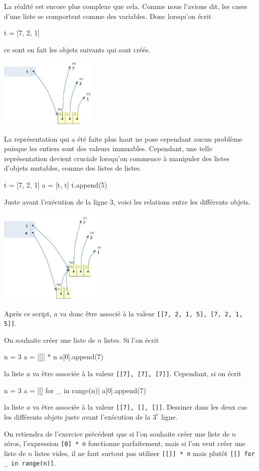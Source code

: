 \documentclass{magnoliaold}
\begin{document}
La réalité est encore plus complexe que cela. Comme nous l'avions dit, les cases d'une liste se
comportent comme des variables. Donc lorsqu'on écrit
\begin{pythoncode}
t = [7, 2, 1]
\end{pythoncode}
\noindent ce sont en fait les objets suivants qui sont créés.
\begin{center}
\includegraphics[width=0.35\textwidth]{../../commun/images/python-cours-tutor-10}
\end{center}
La représentation qui a été faite plus haut ne pose cependant aucun problème puisque les entiers sont
des valeurs immuables. Cependant, une telle représentation devient cruciale lorsqu'on commence à manipuler
des listes d'objets mutables, comme des listes de listes.
\begin{pythoncode}
t = [7, 2, 1]
a = [t, t]
t.append(5)
\end{pythoncode}
\noindent Juste avant l'exécution de la ligne 3, voici les relations entre les différents objets.
\begin{center}
\includegraphics[width=0.39\textwidth]{../../commun/images/python-cours-tutor-12}
\end{center}
Après ce script, $a$ va donc être associé à la valeur \verb![[7, 2, 1, 5], [7, 2, 1, 5]]!.
\vspace{2ex}
\begin{exoUnique}
\exo On souhaite créer une liste de $n$ listes. Si l'on écrit
\begin{pythoncode}
n = 3
a = [[]] * n
a[0].append(7)
\end{pythoncode}
  la liste $a$ va être associée à la valeur \verb![[7], [7], [7]]!. Cependant, si on écrit
\begin{pythoncode}
n = 3
a = [[] for _ in range(n)]
a[0].append(7)
\end{pythoncode}
la liste $a$ va être associée à la valeur \verb![[7], [], []]!. Dessiner dans les deux cas les différents objets
juste avant l'exécution de la $3^e$ ligne.
\end{exoUnique}
\vspace{2ex}
On retiendra de l'exercice précédent que si l'on souhaite créer une liste de $n$ zéros, l'expression
\verb![0] * n! fonctionne parfaitement, mais si l'on veut créer une liste de $n$ listes vides, il ne
faut surtout pas utiliser \verb![[]] * n! mais plutôt \verb![[] for _ in range(n)]!.\\
\end{document}
